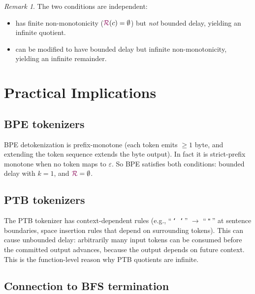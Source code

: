 \documentclass{article}
\newcommand{\Remainder}{{\color{TokenColor}\mathcal{R}}}
\theoremstyle{plain}
\theoremstyle{definition}
\theoremstyle{remark}
\newtheorem{remark}[theorem]{Remark}
\begin{document}
\begin{remark}
The two conditions are independent:
\begin{itemize}
\item {} has finite non-monotonicity ($\Remainder(c) = \emptyset$) but \emph{not} bounded delay, yielding an infinite quotient.
\item {} can be modified to have bounded delay but infinite non-monotonicity, yielding an infinite remainder.
\end{itemize}
\end{remark}



\section{Practical Implications}
\label{sec:practical}

\subsection{BPE tokenizers}

BPE detokenization is prefix-monotone (each token emits $\geq 1$ byte, and
extending the token sequence extends the byte output).  In fact it is
strict-prefix monotone when no token maps to $\varepsilon$.  So BPE satisfies
both conditions: bounded delay with $k = 1$, and $\Remainder = \emptyset$.

\subsection{PTB tokenizers}

The PTB tokenizer has context-dependent rules (e.g., ``\,\texttt{`\,`}\,''
$\to$ ``\,\texttt{"}\,'' at sentence boundaries, space insertion rules that
depend on surrounding tokens).  This can cause unbounded delay: arbitrarily
many input tokens can be consumed before the committed output advances, because
the output depends on future context.  This is the function-level reason why
PTB quotients are infinite.

\subsection{Connection to BFS termination}
\end{document}
